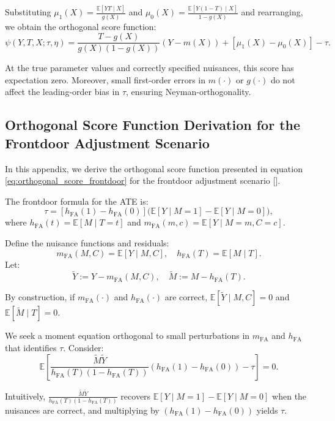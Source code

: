 \documentclass{article}
\numberwithin{equation}{section}
\begin{document}
Substituting \(\mu_1(X) = \frac{\mathbb{E}[Y T \mid X]}{g(X)}\) and \(\mu_0(X)=\frac{\mathbb{E}[Y (1 - T) \mid X]}{1 - g(X)}\) and rearranging, we obtain the orthogonal score function:
\[
\psi(Y, T, X; \tau, \eta) 
= \frac{T - g(X)}{g(X)(1-g(X))}(Y - m(X)) + [\mu_1(X) - \mu_0(X)] - \tau.
\]

At the true parameter values and correctly specified nuisances, this score has expectation zero. Moreover, small first-order errors in \(m(\cdot)\) or \(g(\cdot)\) do not affect the leading-order bias in \(\tau\), ensuring Neyman-orthogonality.

\newpage
\subsection{Orthogonal Score Function Derivation for the Frontdoor Adjustment Scenario}
\label{subsec:appendix_orthogonal_score_function_frontdoor_adjustment_reformatted}

In this appendix, we derive the orthogonal score function presented in equation \eqref{eq:orthogonal_score_frontdoor} for the frontdoor adjustment scenario [\cite{ChernozhukovChetverikovDemireretal2018, Pearl2009}].

The frontdoor formula for the ATE is:
\[
\tau = [h_{\text{FA}}(1) - h_{\text{FA}}(0)]\bigl(\mathbb{E}[Y \mid M=1] - \mathbb{E}[Y \mid M=0]\bigr),
\]
where \(h_{\text{FA}}(t)=\mathbb{E}[M \mid T=t]\) and \(m_{\text{FA}}(m,c)=\mathbb{E}[Y \mid M=m, C=c]\).

Define the nuisance functions and residuals:
\[
m_{\text{FA}}(M,C) = \mathbb{E}[Y \mid M,C], \quad h_{\text{FA}}(T) = \mathbb{E}[M \mid T].
\]
Let:
\[
\tilde{Y} := Y - m_{\text{FA}}(M,C), \quad \tilde{M} := M - h_{\text{FA}}(T).
\]

By construction, if \(m_{\text{FA}}(\cdot)\) and \(h_{\text{FA}}(\cdot)\) are correct, \(\mathbb{E}[\tilde{Y} \mid M,C]=0\) and \(\mathbb{E}[\tilde{M} \mid T]=0\).

We seek a moment equation orthogonal to small perturbations in \(m_{\text{FA}}\) and \(h_{\text{FA}}\) that identifies \(\tau\). Consider:
\[
\mathbb{E}\left[ \frac{\tilde{M}\tilde{Y}}{h_{\text{FA}}(T)(1-h_{\text{FA}}(T))}(h_{\text{FA}}(1)-h_{\text{FA}}(0)) - \tau \right] = 0.
\]

Intuitively, \(\frac{\tilde{M}\tilde{Y}}{h_{\text{FA}}(T)(1-h_{\text{FA}}(T))}\) recovers \(\mathbb{E}[Y \mid M=1]-\mathbb{E}[Y \mid M=0]\) when the nuisances are correct, and multiplying by \((h_{\text{FA}}(1)-h_{\text{FA}}(0))\) yields \(\tau\).
\end{document}
